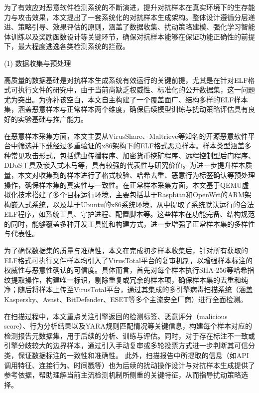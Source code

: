 为了有效应对恶意软件检测系统的不断演进，提升对抗样本在真实环境下的生存能力与攻击效果，本文提出了一套系统化的对抗样本生成架构。整体设计遵循分层递进、策略引导、效果评估的原则，涵盖了数据收集、扰动策略建模、强化学习智能体训练以及奖励函数设计等关键环节，确保对抗样本能够在保证功能正确性的前提下，最大程度逃逸各类检测系统的拦截。


(1) 数据收集与预处理

高质量的数据基础是对抗样本生成系统有效运行的关键前提，尤其是在针对ELF格式可执行文件的研究中，由于当前尚缺乏权威性、标准化的公开数据集，这一问题尤为突出。为弥补该空白，本文自主构建了一个覆盖面广、结构多样的ELF样本集，涵盖恶意样本与正常样本两个维度，确保后续模型训练与扰动策略评估具有良好的实验基础与推广能力。

在恶意样本采集方面，本文主要从VirusShare\cite{VirusShare}、Maltrieve等知名的开源恶意软件平台中筛选并下载经过多重验证的x86架构下的ELF格式恶意样本。样本类型涵盖多种常见攻击形式，包括蠕虫传播程序、加密货币挖矿程序、远程控制型后门程序、DDoS工具及嵌入式木马等，具有较强的代表性与研究价值。为进一步提升样本质量，本文对收集到的样本进行了格式校验、哈希去重、恶意行为标签确认等预处理操作，确保样本集的真实性与一致性。在正常样本采集方面，本文基于QEMU虚拟化技术搭建了多个目标运行环境，主要包括基于Raspbian和OpenWrt的ARM架构嵌入式系统，以及基于Ubuntu的x86系统环境，从中提取了系统默认运行的合法ELF程序，如系统工具、守护进程、配置脚本等。这些样本在功能完备、结构规范的同时，能够覆盖多种开发工具链和构建方式，进一步增强了正常样本集的多样性与代表性。

为了确保数据集的质量与准确性，本文在完成初步样本收集后，针对所有获取的ELF格式可执行文件样本均引入了VirusTotal\cite{VirusTotal}平台的复审机制，以增强样本标注的权威性与恶意性确认的可信度。具体而言，首先对每个样本执行SHA-256等哈希指纹提取操作，构建唯一标识，剔除重复或冗余的样本项，确保样本集的去重和纯净；随后将样本上传至VirusTotal平台，通过其集成的多引擎病毒扫描系统（涵盖Kaspersky、Avast、BitDefender、ESET等多个主流安全厂商）进行全面检测。

在扫描过程中，本文重点关注引擎返回的检测标签、恶意评分（malicious score）、行为分析结果以及YARA规则匹配情况等关键信息，构建每个样本对应的检测报告元数据集，用于后续的分析、训练与评估。同时，对于存在标注不一致或引擎分歧较大的边界样本，通过引入手动复审或多轮投票方式进一步判断其可信分类，保证数据标注的一致性和准确性。
此外，扫描报告中所提取的信息（如API调用特征、连接行为、时间戳等）也为后续的扰动操作设计与对抗样本生成提供了参考依据，帮助理解当前主流检测机制所侧重的关键特征，从而指导扰动策略选择。

